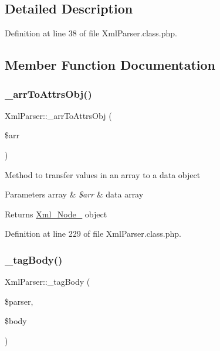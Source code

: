 \subsection{Detailed Description}


Definition at line 38 of file Xml\+Parser.\+class.\+php.



\subsection{Member Function Documentation}
\mbox{\label{classXmlParser_ad6c6c76f2e0c9fbd04c071fc30f1a193}} 
\subsubsection{\texorpdfstring{\+\_\+arr\+To\+Attrs\+Obj()}{\_arrToAttrsObj()}}
{\footnotesize\ttfamily Xml\+Parser\+::\+\_\+arr\+To\+Attrs\+Obj (\begin{DoxyParamCaption}\item[{}]{\$arr }\end{DoxyParamCaption})}

Method to transfer values in an array to a data object 
\begin{DoxyParams}[1]{Parameters}
array & {\em \$arr} & data array \\
\hline
\end{DoxyParams}
\begin{DoxyReturn}{Returns}
\hyperlink{classXml__Node__}{Xml\+\_\+\+Node\+\_\+} object 
\end{DoxyReturn}


Definition at line 229 of file Xml\+Parser.\+class.\+php.

\mbox{\label{classXmlParser_a1205550b688631ab1296365904c61a92}} 
\subsubsection{\texorpdfstring{\+\_\+tag\+Body()}{\_tagBody()}}
{\footnotesize\ttfamily Xml\+Parser\+::\+\_\+tag\+Body (\begin{DoxyParamCaption}\item[{}]{\$parser,  }\item[{}]{\$body }\end{DoxyParamCaption})}

